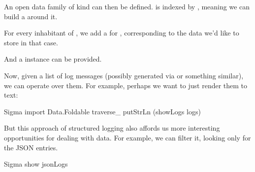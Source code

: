 \documentclass[book.tex]{subfiles}
\begin{document}

An open data family  of kind  can then be
defined.  is indexed by , meaning we can build a
 around it.


For every inhabitant of , we add a  for
, corresponding to the data we'd like to store in that case.


And a  instance can be provided.


Now, given a list of log messages (possibly generated via  or something similar), we can operate over them. For example, perhaps
we want to just render them to text:


\begin{dorepl}{Sigma}
import Data.Foldable
traverse_ putStrLn (showLogs logs)
\end{dorepl}

But this approach of structured logging also affords us more interesting
opportunities for dealing with data. For example, we can filter it, looking only
for the JSON entries.


\begin{dorepl}{Sigma}
show jsonLogs
\end{dorepl}
\end{document}
